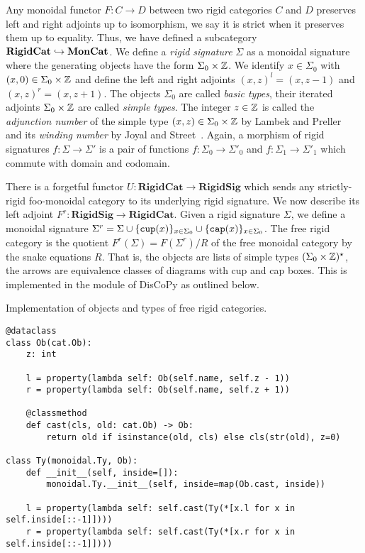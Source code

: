 Any monoidal functor $F : C \to D$ between two rigid categories $C$ and $D$ preserves left and right adjoints up to isomorphism, we say it is strict when it preserves them up to equality.
Thus, we have defined a subcategory $\mathbf{RigidCat} \hookrightarrow \mathbf{MonCat}$.
We define a \emph{rigid signature} $\Sigma$ as a monoidal signature where the generating objects have the form $\Sigma_0 \times \mathbb{Z}$.
We identify $x \in \Sigma_0$ with $(x, 0) \in \Sigma_0 \times \mathbb{Z}$ and define the left and right adjoints $(x, z)^l = (x, z - 1)$ and $(x, z)^r = (x, z + 1)$.
The objects $\Sigma_0$ are called \emph{basic types}, their iterated adjoints $\Sigma_0 \times \mathbb{Z}$ are called \emph{simple types}.
The integer $z \in \mathbb{Z}$ is called the \emph{adjunction number} of the simple type $(x, z) \in \Sigma_0 \times \mathbb{Z}$ by Lambek and Preller~\cite{PrellerLambek07} and its \emph{winding number} by Joyal and Street~\cite{JoyalStreet88}.
Again, a morphism of rigid signatures $f : \Sigma \to \Sigma'$ is a pair of functions $f : \Sigma_0 \to \Sigma'_0$ and $f : \Sigma_1 \to \Sigma'_1$ which commute with domain and codomain.

There is a forgetful functor $U : \mathbf{RigidCat} \to \mathbf{RigidSig}$ which sends any strictly-rigid foo-monoidal category to its underlying rigid signature.
We now describe its left adjoint $F^r : \mathbf{RigidSig} \to \mathbf{RigidCat}$.
Given a rigid signature $\Sigma$, we define a monoidal signature $\Sigma^r = \Sigma \cup \{ \mathtt{cup} (x) \}_{x \in \Sigma_0} \cup \{ \mathtt{cap} (x) \}_{x \in \Sigma_0}$.
The free rigid category is the quotient $F^r(\Sigma) = F(\Sigma^r) / R$ of the free monoidal category by the snake equations $R$.
That is, the objects are lists of simple types $(\Sigma_0 \times \mathbb{Z})^\star$, the arrows are equivalence classes of diagrams with cup and cap boxes.
This is implemented in the  module of DisCoPy as outlined below.

\begin{python}
{\normalfont Implementation of objects and types of free rigid categories.}

\begin{verbatim}
@dataclass
class Ob(cat.Ob):
    z: int

    l = property(lambda self: Ob(self.name, self.z - 1))
    r = property(lambda self: Ob(self.name, self.z + 1))

    @classmethod
    def cast(cls, old: cat.Ob) -> Ob:
        return old if isinstance(old, cls) else cls(str(old), z=0)

class Ty(monoidal.Ty, Ob):
    def __init__(self, inside=[]):
        monoidal.Ty.__init__(self, inside=map(Ob.cast, inside))

    l = property(lambda self: self.cast(Ty(*[x.l for x in self.inside[::-1]])))
    r = property(lambda self: self.cast(Ty(*[x.r for x in self.inside[::-1]])))
\end{verbatim}
\end{python}


